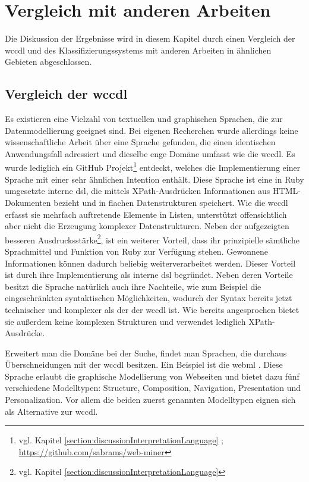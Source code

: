 \section{Vergleich mit anderen Arbeiten}
    Die Diskussion der Ergebnisse wird in diesem Kapitel
    durch einen Vergleich der \gls{wccdl} und des Klassifizierungssystems
    mit anderen Arbeiten in ähnlichen Gebieten abgeschlossen.

    \subsection{Vergleich der \acrshort{wccdl}}
        \label{section:discussionComparisonLanguage}
        Es existieren eine Vielzahl von textuellen und graphischen Sprachen,
        die zur Datenmodellierung geeignet sind.
        Bei eigenen Recherchen wurde allerdings keine wissenschaftliche Arbeit über eine Sprache gefunden,
        die einen identischen Anwendungsfall adressiert und dieselbe enge Domäne umfasst wie die \gls{wccdl}.
        Es wurde lediglich ein
        GitHub Projekt\footnote{vgl. Kapitel \ref{section:discussionInterpretationLanguage} ; \url{https://github.com/sabrams/web-miner}} entdeckt,
        welches die Implementierung einer Sprache mit einer sehr ähnlichen Intention enthält.
        Diese Sprache ist eine in Ruby umgesetzte interne \gls{dsl},
        die mittels XPath-Ausdrücken Informationen aus HTML-Dokumenten bezieht
        und in flachen Datenstrukturen speichert.
        Wie die \gls{wccdl} erfasst sie mehrfach auftretende Elemente in Listen,
        unterstützt offensichtlich aber nicht die Erzeugung komplexer Datenstrukturen.
        Neben der aufgezeigten besseren
        Ausdrucksstärke\footnote{vgl. Kapitel \ref{section:discussionInterpretationLanguage}},
        ist ein weiterer Vorteil,
        dass ihr prinzipielle sämtliche Sprachmittel und Funktion von Ruby
        zur Verfügung stehen.
        Gewonnene Informationen können dadurch beliebig weiterverarbeitet werden.
        Dieser Vorteil ist durch ihre Implementierung als interne \gls{dsl} begründet.
        Neben deren Vorteile besitzt die Sprache natürlich auch ihre Nachteile,
        wie zum Beispiel die eingeschränkten syntaktischen Möglichkeiten,
        wodurch der Syntax bereits jetzt technischer und komplexer als der der \gls{wccdl} ist.
        Wie bereits angesprochen bietet sie außerdem keine komplexen Strukturen und verwendet lediglich XPath-Ausdrücke.

        Erweitert man die Domäne bei der Suche, findet man Sprachen,
        die durchaus Überschneidungen mit der \gls{wccdl} besitzen.
        Ein Beispiel ist die \gls{webml} \cite{ceri:webML}.
        Diese Sprache erlaubt die graphische Modellierung von Webseiten
        und bietet dazu fünf verschiedene Modelltypen:
        Structure, Composition, Navigation, Presentation und Personalization.
        Vor allem die beiden zuerst genannten Modelltypen eignen sich
        als Alternative zur \gls{wccdl}.

